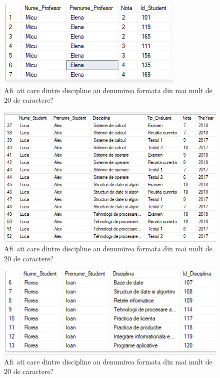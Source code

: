 \documentclass[12pt]{article}
\begin{document}
        \begin{figure}[H]
                \centering
                \includegraphics[width=.95\textwidth]{img11.png}
                \caption{Afi~ati care dintre discipline au denumirea formata din mai mult de 20 de caractere? }
        \end{figure}
        \vspace{0.5 cm}

        \begin{figure}[H]
                \centering
                \includegraphics[width=.95\textwidth]{img12.png}
                \caption{Afi~ati care dintre discipline au denumirea formata din mai mult de 20 de caractere? }
        \end{figure}
        \vspace{0.5 cm}

        \begin{figure}[H]
                \centering
                \includegraphics[width=.95\textwidth]{img13.png}
                \caption{Afi~ati care dintre discipline au denumirea formata din mai mult de 20 de caractere? }
        \end{figure}
        \vspace{0.5 cm}
\end{document}
